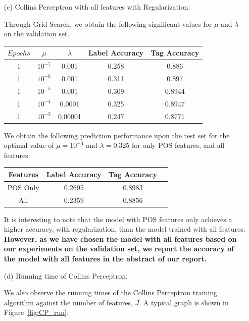 \documentclass[11pt,a4paper,oneside]{article}
\begin{document}
\begin{itemize}
\item[(c)] Collins Perceptron with all features with Regularization:

Through Grid Search, we obtain the following significant values for $\mu$ and $\lambda$ on the validation set.

\begin{center}
\begin{tabular}{|c|c|c|c|c|}
\hline
$Epochs$ & $\mu$ & $\lambda$ & Label Accuracy & Tag Accuracy\\\hline
1&	$10^{-7}$&	0.001&	0.258&	0.886\\\hline
1&	$10^{-6}$&	0.001&	0.311&	0.897\\\hline
1&	$10^{-5}$&	0.001&	0.309&	0.8944\\\hline
1&	$10^{-4}$&	0.0001&	0.325&	0.8947\\\hline
1&	$10^{-3}$&	0.00001&	0.247&	0.8771\\\hline
\end{tabular}
\end{center}


We obtain the following prediction performance upon the test set for the optimal value of $\mu = 10^{-4}$ and $\lambda = 0.325$ for only POS features, and all features.

\begin{center}
\begin{tabular}{|c|c|c|c|}
\hline
Features & Label Accuracy & Tag Accuracy\\\hline
POS Only & 0.2695	& 0.8983\\\hline
All & 0.2359 & 0.8856 \\\hline
\end{tabular}
\end{center}

It is interesting to note that the model with POS features only achieves a higher accuracy, with regularization, than the model trained with all features. \textbf{However, as we have chosen the model with all features based on our experiments on the validation set, we report the accuracy of the model with all features in the abstract of our report.}

\item[(d)] Running time of Collins Perceptron:

We also observe the running times of the Collins Perceptron training algorithm against the number of features, $J$. A typical graph is shown in Figure~\ref{fig:CP_run}.


\end{itemize}
\end{document}
